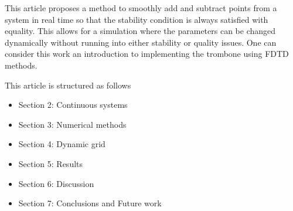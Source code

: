 This article proposes a method to smoothly add and subtract points from a system in real time so that the stability condition is always satisfied with equality. This allows for a simulation where the parameters can be changed dynamically without running into either stability or quality issues. One can consider this work an introduction to implementing the trombone using FDTD methods.

This article is structured as follows 
\begin{itemize}
\item Section 2: Continuous systems
\item Section 3: Numerical methods
\item Section 4: Dynamic grid
\item Section 5: Results
\item Section 6: Discussion
\item Section 7: Conclusions and Future work
\end{itemize}

